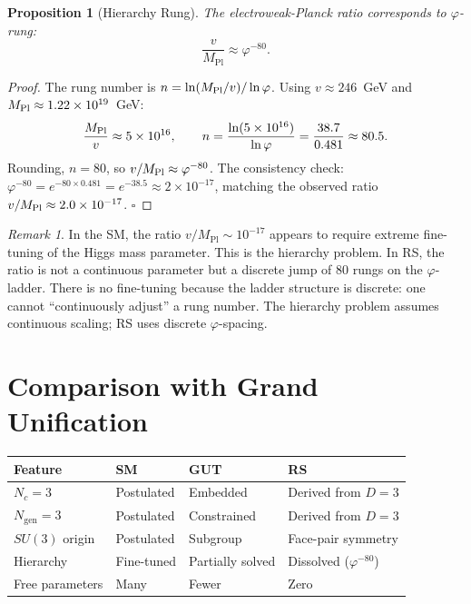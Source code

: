 \documentclass[12pt,a4paper]{article}
\newtheorem{proposition}[theorem]{Proposition}
\theoremstyle{definition}
\theoremstyle{remark}
\newtheorem{remark}[theorem]{Remark}
\begin{document}
\begin{proposition}[Hierarchy Rung]
\label{prop:hierarchy}
The electroweak-Planck ratio corresponds to $\varphi$-rung:
\begin{equation}
  \frac{v}{M_{\mathrm{Pl}}} \approx \varphi^{-80}.
\end{equation}
\end{proposition}

\begin{proof}
The rung number is $n = \ln(M_{\rm Pl}/v)/\ln\varphi$.  Using
$v \approx 246$~GeV and $M_{\rm Pl} \approx 1.22 \times 10^{19}$~GeV:
\[
  \frac{M_{\rm Pl}}{v} \approx 5 \times 10^{16},
  \qquad
  n = \frac{\ln(5 \times 10^{16})}{\ln\varphi}
  = \frac{38.7}{0.481} \approx 80.5.
\]
Rounding, $n = 80$, so $v/M_{\rm Pl} \approx \varphi^{-80}$.  The
consistency check: $\varphi^{-80} = e^{-80 \times 0.481} = e^{-38.5}
\approx 2 \times 10^{-17}$, matching the observed ratio
$v/M_{\rm Pl} \approx 2.0 \times 10^{-17}$.  $\square$
\end{proof}

\begin{remark}
In the SM, the ratio $v/M_{\mathrm{Pl}} \sim 10^{-17}$ appears to
require extreme fine-tuning of the Higgs mass parameter.  This is the
hierarchy problem.  In RS, the ratio is not a continuous parameter but
a discrete jump of 80 rungs on the $\varphi$-ladder.  There is no
fine-tuning because the ladder structure is discrete: one cannot
``continuously adjust'' a rung number.  The hierarchy problem assumes
continuous scaling; RS uses discrete $\varphi$-spacing.
\end{remark}

\section{Comparison with Grand Unification}
\label{sec:compare}

\begin{center}
\renewcommand{\arraystretch}{1.3}
\begin{tabular}{@{}p{3.5cm}p{3.5cm}p{3.5cm}p{3.5cm}@{}}
\toprule
\textbf{Feature} & \textbf{SM} & \textbf{GUT} & \textbf{RS} \\
\midrule
$N_c = 3$ & Postulated & Embedded & Derived from $D = 3$ \\
$N_{\mathrm{gen}} = 3$ & Postulated & Constrained & Derived from $D = 3$ \\
$SU(3)$ origin & Postulated & Subgroup & Face-pair symmetry \\
Hierarchy & Fine-tuned & Partially solved & Dissolved ($\varphi^{-80}$) \\
Free parameters & Many & Fewer & Zero \\
\bottomrule
\end{tabular}
\end{center}
\end{document}
